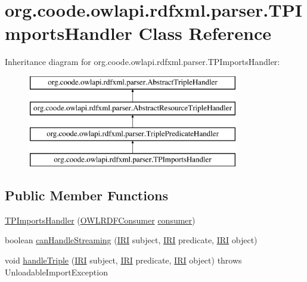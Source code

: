 \hypertarget{classorg_1_1coode_1_1owlapi_1_1rdfxml_1_1parser_1_1_t_p_imports_handler}{\section{org.\-coode.\-owlapi.\-rdfxml.\-parser.\-T\-P\-Imports\-Handler Class Reference}
\label{classorg_1_1coode_1_1owlapi_1_1rdfxml_1_1parser_1_1_t_p_imports_handler}
}
Inheritance diagram for org.\-coode.\-owlapi.\-rdfxml.\-parser.\-T\-P\-Imports\-Handler\-:\begin{figure}[H]
\begin{center}
\leavevmode
\includegraphics[height=4.000000cm]{classorg_1_1coode_1_1owlapi_1_1rdfxml_1_1parser_1_1_t_p_imports_handler}
\end{center}
\end{figure}
\subsection*{Public Member Functions}
\begin{DoxyCompactItemize}
\item 
\hyperlink{classorg_1_1coode_1_1owlapi_1_1rdfxml_1_1parser_1_1_t_p_imports_handler_ac80663f452ba680b1e78da2f65fc0fd8}{T\-P\-Imports\-Handler} (\hyperlink{classorg_1_1coode_1_1owlapi_1_1rdfxml_1_1parser_1_1_o_w_l_r_d_f_consumer}{O\-W\-L\-R\-D\-F\-Consumer} \hyperlink{classorg_1_1coode_1_1owlapi_1_1rdfxml_1_1parser_1_1_abstract_triple_handler_a4ccf4d898ff01eb1cadfa04b23d54e9c}{consumer})
\item 
boolean \hyperlink{classorg_1_1coode_1_1owlapi_1_1rdfxml_1_1parser_1_1_t_p_imports_handler_a22e444da822ba59c1c2770961d0cfe76}{can\-Handle\-Streaming} (\hyperlink{classorg_1_1semanticweb_1_1owlapi_1_1model_1_1_i_r_i}{I\-R\-I} subject, \hyperlink{classorg_1_1semanticweb_1_1owlapi_1_1model_1_1_i_r_i}{I\-R\-I} predicate, \hyperlink{classorg_1_1semanticweb_1_1owlapi_1_1model_1_1_i_r_i}{I\-R\-I} object)
\item 
void \hyperlink{classorg_1_1coode_1_1owlapi_1_1rdfxml_1_1parser_1_1_t_p_imports_handler_abe08d57f64e8cbdbc9ef234729539a9f}{handle\-Triple} (\hyperlink{classorg_1_1semanticweb_1_1owlapi_1_1model_1_1_i_r_i}{I\-R\-I} subject, \hyperlink{classorg_1_1semanticweb_1_1owlapi_1_1model_1_1_i_r_i}{I\-R\-I} predicate, \hyperlink{classorg_1_1semanticweb_1_1owlapi_1_1model_1_1_i_r_i}{I\-R\-I} object)  throws Unloadable\-Import\-Exception 
\end{DoxyCompactItemize}

